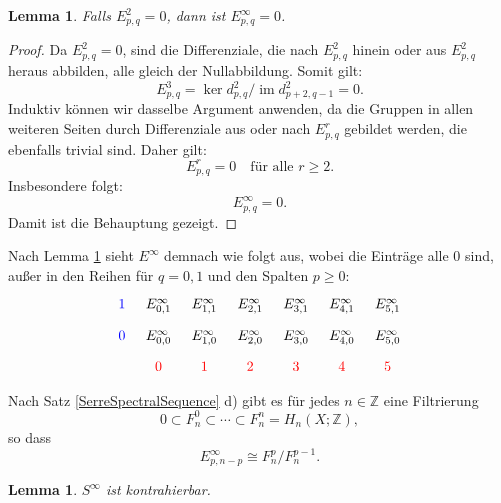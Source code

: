 \documentclass[12pt]{article}
\numberwithin{conj}{section}
\newtheorem{lemma}[conj]{Lemma}
\begin{document}
    \begin{lemma}
        \label{lemma:infinitysection} Falls $E^{2}_{p,q}= 0$, dann ist
        $E^{\infty}_{p,q}= 0$.
    \end{lemma}

    \begin{proof}
        Da $E^{2}_{p,q}= 0$, sind die Differenziale, die nach $E^{2}_{p,q}$ hinein oder
        aus $E^{2}_{p,q}$ heraus abbilden, alle gleich der Nullabbildung. Somit gilt:
        \[
            E^{3}_{p,q}= \ker d^{2}_{p,q}  / \operatorname{im} d^{2}_{p+2,q-1} = 0.
        \]
        Induktiv können wir dasselbe Argument anwenden, da die Gruppen in allen weiteren
        Seiten durch Differenziale aus oder nach $E^{r}_{p,q}$ gebildet werden, die
        ebenfalls trivial sind. Daher gilt:
        \[
            E^{r}_{p,q}= 0 \quad \text{für alle }r \geq 2.
        \]
        Insbesondere folgt:
        \[
            E^{\infty}_{p,q}= 0.
        \]
        Damit ist die Behauptung gezeigt.
    \end{proof}

    Nach Lemma \ref{lemma:infinitysection} sieht $E^{\infty}$ demnach wie folgt
    aus, wobei die Einträge alle $0$ sind, außer in den Reihen für $q = 0,1$ und
    den Spalten $p \geq 0$:
    \[
        \begin{tikzcd}
            [sep=tiny] {\color{blue}1} & {E^\infty_{0,1}} & {E^\infty_{1,1}} & {E^\infty_{2,1}}
            & {E^\infty_{3,1}} & {E^\infty_{4,1}} & {E^\infty_{5,1}} \\ {\color{blue}0}
            & {E^\infty_{0,0}} & {E^\infty_{1,0}} & {E^\infty_{2,0}} & {E^\infty_{3,0}}
            & {E^\infty_{4,0}} & {E^\infty_{5,0}} \\ & {\color{red}0} & {\color{red}1}
            & {\color{red}2} & {\color{red}3} & {\color{red}4} & {\color{red}5}
        \end{tikzcd}
    \]

    Nach Satz \ref{SerreSpectralSequence} d) gibt es für jedes
    $n \in \mathbb{Z}$ eine Filtrierung
    \[
        0 \subset F^{0}_{n} \subset \cdots \subset F^{n}_{n} = H_{n}(X;\mathbb{Z}),
    \]
    so dass
    \[
        E^{\infty}_{p,n-p}\cong F_{n}^{p} / F_{n}^{p-1}.
    \]

    \begin{lemma}
    $S^\infty$ ist kontrahierbar.
    \end{lemma}
\end{document}

